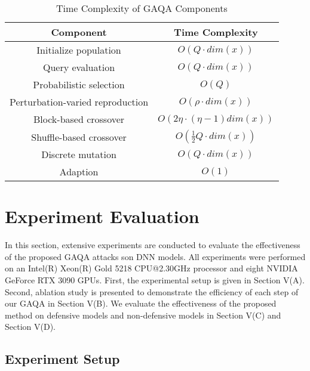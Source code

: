 \documentclass[lettersize,journal]{IEEEtran}
\begin{document}
	
	\begin{table}[!b]
		\centering
		\caption{Time Complexity of GAQA Components}
		\begin{tabular}{cc}
			\toprule
			Component & \multicolumn{1}{c}{Time Complexity}  \\
			\midrule
			Initialize population   & \multicolumn{1}{c}{$O(Q\cdot dim(x))$}  \\
			Query evaluation   & \multicolumn{1}{c}{$O(Q\cdot dim(x))$}  \\
			Probabilistic selection   & \multicolumn{1}{c}{$O(Q)$}  \\
			Perturbation-varied reproduction  & \multicolumn{1}{c}{$O(\rho \cdot dim(x))$}  \\
			Block-based crossover  & \multicolumn{1}{c}{$O(2\eta\cdot(\eta-1)dim(x))$}  \\
			Shuffle-based crossover   & \multicolumn{1}{c}{$O(\frac{1}{2}Q\cdot dim(x))$}  \\
			Discrete mutation  & \multicolumn{1}{c}{$O(Q\cdot dim(x))$}  \\
			Adaption   & \multicolumn{1}{c}{$O(1)$} \\
			\bottomrule
		\end{tabular}
		\label{tab:ana}
	\end{table}
	
	
	
	
	\section{Experiment Evaluation} 
	In this section, extensive experiments are conducted to evaluate the effectiveness of the proposed GAQA attacks son DNN models. All experiments were performed on an Intel(R) Xeon(R) Gold 5218 CPU@2.30GHz processor and eight NVIDIA GeForce RTX 3090 GPUs. 
	First, the experimental setup is given in Section V(A). Second, ablation study is presented to demonstrate the efficiency of each step of our GAQA in Section V(B). 
	We evaluate the effectiveness of the proposed method on defensive models and non-defensive models in Section V(C) and Section V(D).
	
	
	
	\subsection{Experiment Setup}
	
\end{document}
